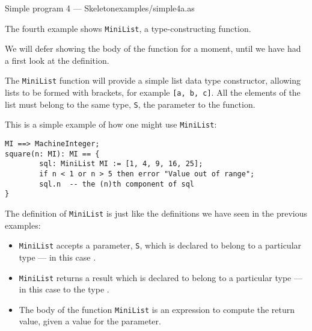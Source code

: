\clearpage
{Simple program 4 --- Skeleton}{examples/simple4a.as}

The fourth example shows {\tt MiniList}, a type-constructing function.


We will defer showing the body of the function for a moment,
until we have had a first look at the definition.

The {\tt MiniList} function will provide a simple list data type
constructor, allowing lists to be formed with brackets, for example
\verb"[a, b, c]".  All the elements of the list must belong to the same
type, \verb"S", the parameter to the function.  

This is a simple example of how one might use \verb"MiniList":

\begin{small}
\begin{verbatim}
MI ==> MachineInteger;
square(n: MI): MI == {
        sql: MiniList MI := [1, 4, 9, 16, 25];
        if n < 1 or n > 5 then error "Value out of range";
        sql.n  -- the (n)th component of sql
}
\end{verbatim}
\end{small}

The definition of \verb"MiniList" is just like the definitions
we have seen in the previous examples:
\begin{itemize}
\item
  {\tt MiniList} accepts a parameter, \verb"S", which is declared to belong
  to a particular type --- in this case .
\item
  {\tt MiniList} returns a result which is declared to belong to
  a particular type --- in this case to the type .
\item
  The body of the function {\tt MiniList} is an expression
  to compute the return value, given a value for the parameter. 
\end{itemize}

